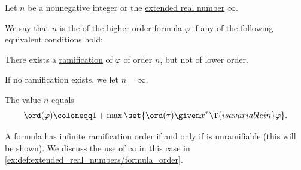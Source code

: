 \begin{definition}\label{def:hol_formula_ramification_order}\mimprovised
  Let \( n \) be a nonnegative integer or the \hyperref[def:extended_real_numbers]{extended real number} \( \infty \).

  We say that \( n \) is the  of the \hyperref[def:hol_expression/formula]{higher-order formula} \( \varphi \) if any of the following equivalent conditions hold:
  \begin{thmenum}
     There exists a \hyperref[def:ramified_theory_of_types/formulas]{ramification} of \( \varphi \) of order \( n \), but not of lower order.

    If no ramification exists, we let \( n = \infty \).

     The value \( n \) equals
    \begin{equation}\label{eq:def:hol_formula_ramification_order/direct}
      \ord(\varphi) \coloneqq 1 + \max\set{ \ord(\tau) \given x^\tau \T{is a variable in} \varphi }.
    \end{equation}
  \end{thmenum}
\end{definition}
\begin{comments}
  \item A formula has infinite ramification order if and only if is unramifiable (this will be shown). We discuss the use of \( \infty \) in this case in \cref{ex:def:extended_real_numbers/formula_order}.
\end{comments}
